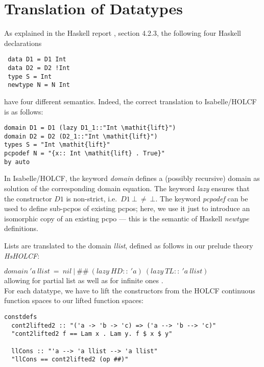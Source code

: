 \documentclass{llncs}
\begin{document}
\section{Translation of Datatypes}

As explained in the Haskell report \cite{HaskellRep}, section 4.2.3,
the following four Haskell declarations

\begin{verbatim}
 data D1 = D1 Int
 data D2 = D2 !Int
 type S = Int
 newtype N = N Int
\end{verbatim}

have four different semantics. Indeed, the correct translation to
Isabelle/HOLCF is as follows:

\begin{verbatim}
domain D1 = D1 (lazy D1_1::"Int \mathit{lift}")
domain D2 = D2 (D2_1::"Int \mathit{lift}")
types S = "Int \mathit{lift}"
pcpodef N = "{x:: Int \mathit{lift} . True}"
by auto
\end{verbatim}
\noindent In Isabelle/HOLCF, the keyword \emph{domain} defines a
(possibly recursive) domain as solution of the corresponding domain
equation.  The keyword \emph{lazy} ensures that the constructor $D1$
is non-strict, i.e.\ $D1 \ \bot \ \neq \ \bot$.  The keyword
\emph{pcpodef} can be used to define sub-pcpos of existing pcpos;
here, we use it just to introduce an isomorphic copy of an existing
pcpo --- this is the semantic of Haskell \emph{newtype} definitions.


Lists are translated to the domain \emph{llist}, defined as follows 
in our prelude theory \emph{HsHOLCF}:

$domain \ 'a\ llist \ = \ nil \ | \ \#\# \ (lazy\ HD :: \ 'a) \ 
(lazy \ TL :: \ 'a \ llist) $\\

\noindent allowing for partial list as well as for infinite ones \cite{holcf}.\\

For each datatype, we have to lift the constructors from the
HOLCF continuous function spaces to our lifted function spaces:

\begin{verbatim}
constdefs
  cont2lifted2 :: "('a -> 'b -> 'c) => ('a --> 'b --> 'c)"
  "cont2lifted2 f == Lam x . Lam y. f $ x $ y"

  llCons :: "'a --> 'a llist --> 'a llist"
  "llCons == cont2lifted2 (op ##)"
\end{verbatim}
\end{document}
